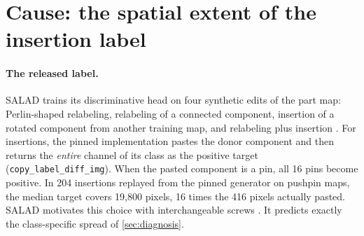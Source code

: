 \section{Cause: the spatial extent of the insertion label}
\label{sec:cause}
\begin{table}[t]
\centering
\caption{\textbf{One protocol for every detector.} Matched trays, extracted path: fault/vacancy and valid-sham alarms (of 138), spread (untouched compartments changing by $\ge0.5$ after a relocation; probability maps only), wasted inspections $W$ per faulty tray with target recall $R$ for the threshold and the development-selected list, $W$ for the threshold on pooled relocation and vacancy trays, compartments queued per valid sham, and the cell analogue of low-FPR sPRO with only faulty-tray negatives (fault) or also the source and sham compartments (all). Native LOCO: AU-sPRO up to 5\% FPR and image AUROC on the 91 logical anomalies and 138 good pushpin images. Class-wide and footprint heads are retrained from the released head on identical inputs (\cref{sec:cause}).}
\label{tab:main}
\footnotesize\setlength{\tabcolsep}{3.1pt}

\end{table}

\paragraph{The released label.}
SALAD trains its discriminative head on four synthetic edits of the part map: Perlin-shaped relabeling, relabeling of a connected component, insertion of a rotated component from another training map, and relabeling plus insertion \cite{fucka2025}. For insertions, the pinned implementation pastes the donor component and then returns the \emph{entire} channel of its class as the positive target (\texttt{copy\_label\_diff\_img}). When the pasted component is a pin, all 16 pins become positive. In 204 insertions replayed from the pinned generator on pushpin maps, the median target covers 19{,}800 pixels, 16 times the 416 pixels actually pasted. SALAD motivates this choice with interchangeable screws \cite{fucka2025}. It predicts exactly the class-specific spread of \cref{sec:diagnosis}.

